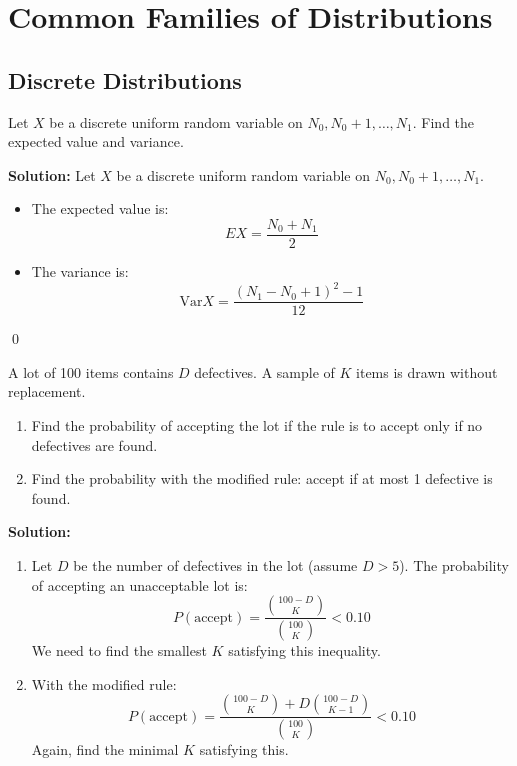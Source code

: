 
\chapter{Common Families of Distributions}

\section{Discrete Distributions}

\begin{problembox}
Let \( X \) be a discrete uniform random variable on \( N_0, N_0+1, \ldots, N_1 \). Find the expected value and variance.
\end{problembox}

\noindent\textbf{Solution:}
Let \( X \) be a discrete uniform random variable on \( N_0, N_0+1, \ldots, N_1 \). 

\begin{itemize}
\item The expected value is:
\[ EX = \frac{N_0 + N_1}{2} \]

\item The variance is:
\[ \text{Var}X = \frac{(N_1 - N_0 + 1)^2 - 1}{12} \]
\end{itemize}


\qed
\begin{problembox}
A lot of 100 items contains \( D \) defectives. A sample of \( K \) items is drawn without replacement.
\begin{enumerate}[label=(\alph*)]
\item Find the probability of accepting the lot if the rule is to accept only if no defectives are found.
\item Find the probability with the modified rule: accept if at most 1 defective is found.
\end{enumerate}
\end{problembox}

\noindent\textbf{Solution:}
\begin{enumerate}[label=(\alph*)]
\item Let \( D \) be the number of defectives in the lot (assume \( D > 5 \)). The probability of accepting an unacceptable lot is:
\[ P(\text{accept}) = \frac{\binom{100-D}{K}}{\binom{100}{K}} < 0.10 \]
We need to find the smallest \( K \) satisfying this inequality.

\item With the modified rule:
\[ P(\text{accept}) = \frac{\binom{100-D}{K} + D\binom{100-D}{K-1}}{\binom{100}{K}} < 0.10 \]
Again, find the minimal \( K \) satisfying this.
\end{enumerate}


